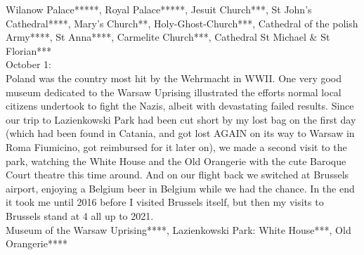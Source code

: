 Wilanow Palace*****, Royal Palace*****, Jesuit Church***, St John's Cathedral****, Mary's Church**, Holy-Ghost-Church***, Cathedral of the polish Army****, St Anna****, Carmelite Church***, Cathedral St Michael \& St Florian***\\

October 1:\\
Poland was the country most hit by the Wehrmacht in WWII. One very good museum dedicated to the Warsaw Uprising illustrated the efforts normal local citizens undertook to fight the Nazis, albeit with devastating failed results. Since our trip to Lazienkowski Park had been cut short by my lost bag on the first day (which had been found in Catania, and got lost AGAIN on its way to Warsaw in Roma Fiumicino, got reimbursed for it later on), we made a second visit to the park, watching the White House and the Old Orangerie with the cute Baroque Court theatre this time around. And on our flight back we switched at Brussels airport, enjoying a Belgium beer in Belgium while we had the chance. In the end it took me until 2016 before I visited Brussels itself, but then my visits to Brussels stand at 4 all up to 2021.\\

Museum of the Warsaw Uprising****, Lazienkowski Park: White House***, Old Orangerie****
